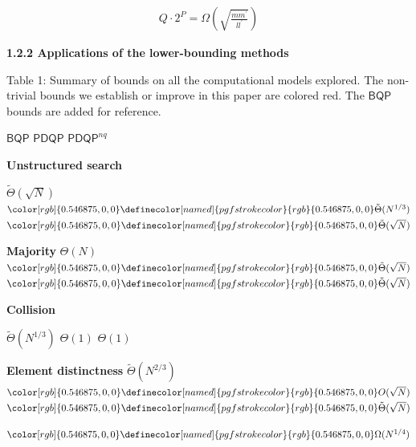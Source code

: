 \[\begin{gathered}
\displaystyle Q\cdot 2^{P}=\Omega\left(\sqrt{\frac{mm^{\prime}}{ll^{\prime}}}\right)
\end{gathered}\]







\par\medskip\noindent\textbf{
1.2.2 Applications of the lower-bounding methods}\par



Table 1: Summary of bounds on all the computational models explored. The non-trivial bounds we establish or improve in this paper are colored red. The $\mathsf{BQP}$ bounds are added for reference.




 
$\mathsf{BQP}$ 
$\mathsf{PDQP}$ 
$\mathsf{PDQP}^{nq}$ 
\par



 \textbf{Unstructured search}
 
$\tilde{\Theta}(\sqrt{N})$ 
$\color[rgb]{0.546875,0,0}\definecolor[named]{pgfstrokecolor}{rgb}{0.546875,0,0}\tilde{\Theta}(N^{1/3})$ 
$\color[rgb]{0.546875,0,0}\definecolor[named]{pgfstrokecolor}{rgb}{0.546875,0,0}\tilde{\Theta}(\sqrt{N})$ 
\par


\textbf{Majority} 
$\Theta(N)$ 
$\color[rgb]{0.546875,0,0}\definecolor[named]{pgfstrokecolor}{rgb}{0.546875,0,0}\tilde{\Theta}(\sqrt{N})$ 
$\color[rgb]{0.546875,0,0}\definecolor[named]{pgfstrokecolor}{rgb}{0.546875,0,0}\tilde{\Theta}(\sqrt{N})$ 
\par



\textbf{Collision}
 
$\tilde{\Theta}(N^{1/3})$ 
$\Theta(1)$ 
$\Theta(1)$ 
\par


\textbf{Element distinctness} 
$\tilde{\Theta}(N^{2/3})$ 
$\color[rgb]{0.546875,0,0}\definecolor[named]{pgfstrokecolor}{rgb}{0.546875,0,0}O(\sqrt{N})$ 
$\color[rgb]{0.546875,0,0}\definecolor[named]{pgfstrokecolor}{rgb}{0.546875,0,0}\tilde{\Theta}(\sqrt{N})$ 
\par


$\color[rgb]{0.546875,0,0}\definecolor[named]{pgfstrokecolor}{rgb}{0.546875,0,0}\Omega(N^{1/4})$ 
\par







